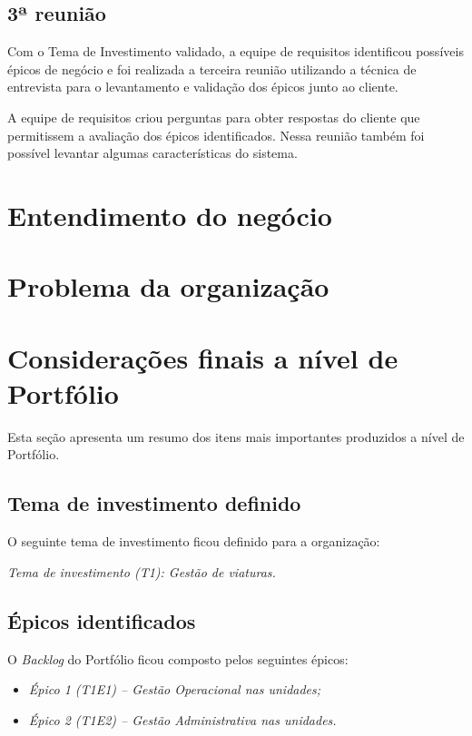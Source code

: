     \subsection{3ª reunião}
    
      Com o Tema de Investimento validado, a equipe de requisitos identificou possíveis épicos de negócio e foi realizada a terceira
      reunião utilizando a técnica de entrevista para o levantamento e validação dos épicos junto ao cliente.
      
      A equipe de requisitos criou perguntas para obter respostas do cliente que permitissem a avaliação dos épicos identificados.
      Nessa reunião também foi possível levantar algumas características do sistema.
    
  \section{Entendimento do negócio}
  
    
    
  \section{Problema da organização}
    
    
  
  \section{Considerações finais a nível de Portfólio}
    
    Esta seção apresenta um resumo dos itens mais importantes produzidos a nível de Portfólio.
    
    \subsection{Tema de investimento definido}
      
      O seguinte tema de investimento ficou definido para a organização:
      
      \emph{Tema de investimento (T1): Gestão de viaturas.}
    
    \subsection{Épicos identificados}
      
      O \textit{Backlog} do Portfólio ficou composto pelos seguintes épicos:
      
      \begin{itemize}
      \item \emph{Épico 1 (T1E1) – Gestão Operacional nas unidades;}
      \item \emph{Épico 2 (T1E2) – Gestão Administrativa nas unidades.}
      \end{itemize}

    